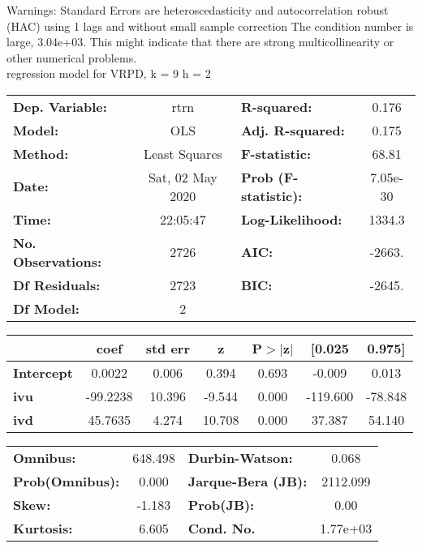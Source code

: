 Warnings: \newline
 [1] Standard Errors are heteroscedasticity and autocorrelation robust (HAC) using 1 lags and without small sample correction \newline
 [2] The condition number is large, 3.04e+03. This might indicate that there are \newline
 strong multicollinearity or other numerical problems.\\ 

regression model for VRPD, k = 9 h = 2\begin{center}
\begin{tabular}{lclc}
\toprule
\textbf{Dep. Variable:}    &       rtrn       & \textbf{  R-squared:         } &     0.176   \\
\textbf{Model:}            &       OLS        & \textbf{  Adj. R-squared:    } &     0.175   \\
\textbf{Method:}           &  Least Squares   & \textbf{  F-statistic:       } &     68.81   \\
\textbf{Date:}             & Sat, 02 May 2020 & \textbf{  Prob (F-statistic):} &  7.05e-30   \\
\textbf{Time:}             &     22:05:47     & \textbf{  Log-Likelihood:    } &    1334.3   \\
\textbf{No. Observations:} &        2726      & \textbf{  AIC:               } &    -2663.   \\
\textbf{Df Residuals:}     &        2723      & \textbf{  BIC:               } &    -2645.   \\
\textbf{Df Model:}         &           2      & \textbf{                     } &             \\
\bottomrule
\end{tabular}
\begin{tabular}{lcccccc}
                   & \textbf{coef} & \textbf{std err} & \textbf{z} & \textbf{P$> |$z$|$} & \textbf{[0.025} & \textbf{0.975]}  \\
\midrule
\textbf{Intercept} &       0.0022  &        0.006     &     0.394  &         0.693        &       -0.009    &        0.013     \\
\textbf{ivu}       &     -99.2238  &       10.396     &    -9.544  &         0.000        &     -119.600    &      -78.848     \\
\textbf{ivd}       &      45.7635  &        4.274     &    10.708  &         0.000        &       37.387    &       54.140     \\
\bottomrule
\end{tabular}
\begin{tabular}{lclc}
\textbf{Omnibus:}       & 648.498 & \textbf{  Durbin-Watson:     } &    0.068  \\
\textbf{Prob(Omnibus):} &   0.000 & \textbf{  Jarque-Bera (JB):  } & 2112.099  \\
\textbf{Skew:}          &  -1.183 & \textbf{  Prob(JB):          } &     0.00  \\
\textbf{Kurtosis:}      &   6.605 & \textbf{  Cond. No.          } & 1.77e+03  \\
\bottomrule
\end{tabular}
\end{center}

